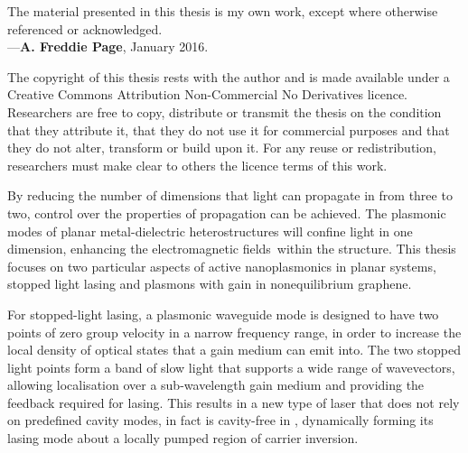 

The material presented in this thesis is my own work, except where otherwise
referenced or acknowledged.
\\
—\textbf{A. Freddie Page}, January 2016.

\vspace{\fill}

The copyright of this thesis rests with the author and is made available under a
Creative Commons Attribution Non-Commercial No Derivatives licence.
Researchers are free to copy, distribute or transmit the thesis on the condition
that they attribute it, that they do not use it for commercial purposes and that
they do not alter, transform or build upon it.
For any reuse or redistribution, researchers must make clear to others the
licence terms of this work.


\clearpage

\small

By reducing the number of dimensions that light can propagate in from three to
two, control over the properties of propagation can be achieved.
The plasmonic modes of planar metal-dielectric heterostructures
will confine light in one dimension, enhancing the
electromagnetic fields within the structure.
This thesis focuses on two particular aspects of active
nanoplasmonics in planar systems, stopped light lasing and plasmons with gain in
nonequilibrium graphene.

For stopped-light lasing, a plasmonic waveguide mode is designed to have two
points of zero group velocity in a narrow frequency range, in order to increase
the local density of optical states that a gain medium can emit into.
The two stopped light points form a band of slow light that supports a wide
range of wavevectors, allowing localisation over a sub-wavelength gain medium
and providing the feedback required for lasing.
This results in a new type of laser that does not rely on predefined cavity
modes, in fact is cavity-free in \twod, dynamically forming its lasing mode
about a locally pumped region of carrier inversion.

